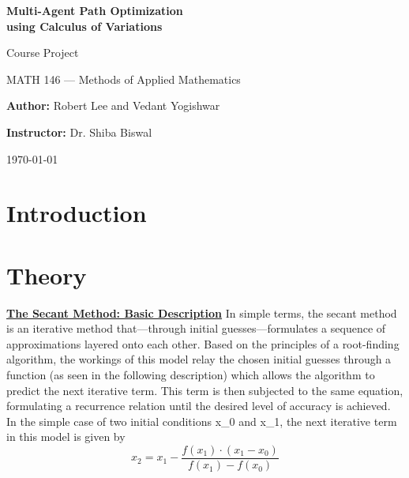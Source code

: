 \documentclass[11pt]{article}
\begin{document}
\begin{titlepage}
    \centering
    \null
    
    {\huge \textbf{Multi-Agent Path Optimization\\using Calculus of Variations}\par}
    \vspace{5mm}
    {\Large \large Course Project\par
    MATH 146 --- Methods of Applied Mathematics\par}
    \vspace{5mm}
    {\large \textbf{Author:} Robert Lee and Vedant Yogishwar\par
    \textbf{Instructor:} Dr. Shiba Biswal\par}
    
    
    {\large \today\par}
\end{titlepage}

\clearpage

\tableofcontents

\clearpage

\begin{abstract}
\lipsum[1-2]
\end{abstract}

\clearpage

\printunsrtglossary[type=symbols,style=long,title={List of Symbols}]

\section{Introduction}

\section{Theory}
\underline{\textbf{The Secant Method: Basic Description}}
In simple terms, the secant method is an iterative method that—through initial guesses—formulates a sequence of approximations layered onto each other. Based on the principles of a root-finding algorithm, the workings of this model relay the chosen initial guesses through a function (as seen in the following description) which allows the algorithm to predict the next iterative term. This term is then subjected to the same equation, formulating a recurrence relation until the desired level of accuracy is achieved. In the simple case of two initial conditions x_0 and x_1, the next iterative term in this model is given by 
\begin{equation}
x_2 = x_1 - \frac{f(x_1) \cdot (x_1 - x_0)}{f(x_1) - f(x_0)}
\end{equation}
\end{document}
